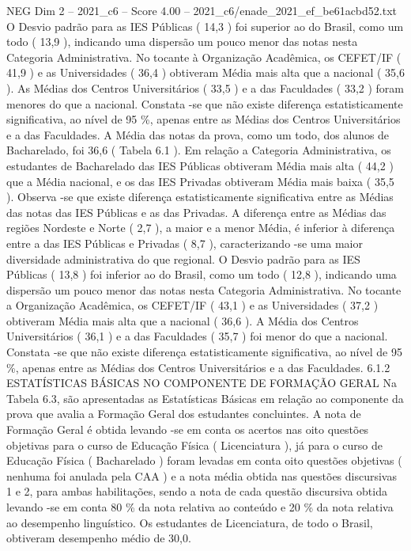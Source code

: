 \begin{textsample}{NEG Dim 2 – 2021\_c6 – Score 4.00 – 2021\_c6/enade\_2021\_ef\_be61acbd52.txt}
O Desvio padrão para as IES Públicas ( 14,3 ) foi superior ao do Brasil, como um todo ( 13,9 ), indicando uma dispersão um pouco menor das notas nesta Categoria Administrativa.
No tocante à Organização Acadêmica, os CEFET/IF ( 41,9 ) e as Universidades ( 36,4 ) obtiveram Média mais alta que a nacional ( 35,6 ).
As Médias dos Centros Universitários ( 33,5 ) e a das Faculdades ( 33,2 ) foram menores do que a nacional.
Constata -se que não existe diferença estatisticamente significativa, ao nível de 95 \%, apenas entre as Médias dos Centros Universitários e a das Faculdades.
A Média das notas da prova, como um todo, dos alunos de Bacharelado, foi 36,6 ( Tabela 6.1 ).
Em relação a Categoria Administrativa, os estudantes de Bacharelado das IES Públicas obtiveram Média mais alta ( 44,2 ) que a Média nacional, e os das IES Privadas obtiveram Média mais baixa ( 35,5 ).
Observa -se que existe diferença estatisticamente significativa entre as Médias das notas das IES Públicas e as das Privadas.
A diferença entre as Médias das regiões Nordeste e Norte ( 2,7 ), a maior e a menor Média, é inferior à diferença entre a das IES Públicas e Privadas ( 8,7 ), caracterizando -se uma maior diversidade administrativa do que regional.
O Desvio padrão para as IES Públicas ( 13,8 ) foi inferior ao do Brasil, como um todo ( 12,8 ), indicando uma dispersão um pouco menor das notas nesta Categoria Administrativa.
No tocante a Organização Acadêmica, os CEFET/IF ( 43,1 ) e as Universidades ( 37,2 ) obtiveram Média mais alta que a nacional ( 36,6 ).
A Média dos Centros Universitários ( 36,1 ) e a das Faculdades ( 35,7 ) foi menor do que a nacional.
Constata -se que não existe diferença estatisticamente significativa, ao nível de 95 \%, apenas entre as Médias dos Centros Universitários e a das Faculdades. 6.1.2 ESTATÍSTICAS BÁSICAS NO COMPONENTE DE FORMAÇÃO GERAL Na Tabela 6.3, são apresentadas as Estatísticas Básicas em relação ao componente da prova que avalia a Formação Geral dos estudantes concluintes.
A nota de Formação Geral é obtida levando -se em conta os acertos nas oito questões objetivas para o curso de Educação Física ( Licenciatura ), já para o curso de Educação Física ( Bacharelado ) foram levadas em conta oito questões objetivas ( nenhuma foi anulada pela CAA ) e a nota média obtida nas questões discursivas 1 e 2, para ambas habilitações, sendo a nota de cada questão discursiva obtida levando -se em conta 80 \% da nota relativa ao conteúdo e 20 \% da nota relativa ao desempenho linguístico.
Os estudantes de Licenciatura, de todo o Brasil, obtiveram desempenho médio de 30,0.

\end{textsample}
